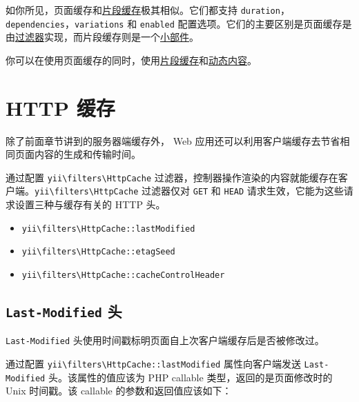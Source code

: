 如你所见，页面缓存和\hyperref[caching-fragment.md]{片段缓存}极其相似。它们都支持 \lstinline|duration|，\lstinline|dependencies|，\lstinline|variations| 和 \lstinline|enabled| 配置选项。它们的主要区别是页面缓存是由\hyperref[structure-filters.md]{过滤器}实现，而片段缓存则是一个\hyperref[structure-widgets.md]{小部件}。

你可以在使用页面缓存的同时，使用\hyperref[caching-fragment.md]{片段缓存}和\hyperref[caching-fragment.md::dynamic-content]{动态内容}。



\label{caching-http.md}\section{HTTP 缓存}
除了前面章节讲到的服务器端缓存外， Web 应用还可以利用客户端缓存去节省相同页面内容的生成和传输时间。

通过配置 \texttt{yii{\allowbreak{}\textbackslash}filters{\allowbreak{}\textbackslash}HttpCache} 过滤器，控制器操作渲染的内容就能缓存在客户端。\texttt{yii{\allowbreak{}\textbackslash}filters{\allowbreak{}\textbackslash}HttpCache} 过滤器仅对 \lstinline|GET| 和 \lstinline|HEAD| 请求生效，它能为这些请求设置三种与缓存有关的 HTTP 头。

\begin{itemize}
\item \texttt{yii{\allowbreak{}\textbackslash}filters{\allowbreak{}\textbackslash}HttpCache\allowbreak{}::\allowbreak{}lastModified}
\item \texttt{yii{\allowbreak{}\textbackslash}filters{\allowbreak{}\textbackslash}HttpCache\allowbreak{}::\allowbreak{}etagSeed}
\item \texttt{yii{\allowbreak{}\textbackslash}filters{\allowbreak{}\textbackslash}HttpCache\allowbreak{}::\allowbreak{}cacheControlHeader}
\end{itemize}
\subsection{\lstinline|Last-Modified| 头 \label{caching-http.md::last-modified}}
\lstinline|Last-Modified| 头使用时间戳标明页面自上次客户端缓存后是否被修改过。

通过配置 \texttt{yii{\allowbreak{}\textbackslash}filters{\allowbreak{}\textbackslash}HttpCache\allowbreak{}::\allowbreak{}lastModified} 属性向客户端发送 \lstinline|Last-Modified| 头。该属性的值应该为 PHP callable 类型，返回的是页面修改时的 Unix 时间戳。该 callable 的参数和返回值应该如下：

